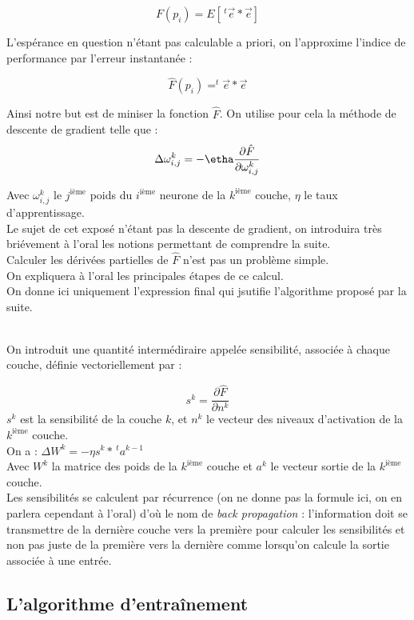 \documentclass[a4paper, 11pt]{article}
\begin{document}
$$ F(p_i)  = E[\,^t  \vec{e} * \vec{e}]$$

L'espérance en question n'étant pas calculable a priori, on l'approxime l'indice de performance par l'erreur instantanée :

$$  \hat{F}(p_i) = ^t \vec{e}*\vec{e}$$

Ainsi notre but est de miniser la fonction $ \hat{F} $.
On utilise pour cela la méthode de descente de gradient telle que : \\

$$ 
	\Delta \omega^{k}_{i,j} = -\etha \frac{\partial \hat{F}}{\partial \omega^{k}_{i,j}}
$$

Avec $ \omega^{k}_{i,j}$ le $j^{\text{ième}}$ poids du $i^{\text{ième}}$ neurone de la $k^{\text{ième}}$ couche, $\eta$ le taux d'apprentissage.\\
Le sujet de cet exposé n'étant pas la descente de gradient, on introduira très briévement à l'oral les notions permettant de comprendre la suite.\\
Calculer les dérivées partielles de $\hat{F}$ n'est pas un problème simple.
\\ On expliquera à l'oral les principales étapes de ce calcul.
\\ On donne ici uniquement l'expression final qui jsutifie l'algorithme proposé par la suite.

\\ On introduit une quantité intermédiraire appelée sensibilité, associée à chaque couche, définie vectoriellement par : 

$$ s^k = \frac{\partial \hat{F} }{\partial{n^k}}$$
$s^k$ est la sensibilité de la couche $k$, et $n^k$ le vecteur des niveaux d'activation de la $k^{\text{ième}}$ couche.
\\
\noident On a : $\Delta W^k = -\eta s^k * \,^t a^{k-1}$
\\ Avec $W^k$ la matrice des poids de la $k^{\text{ième}}$ couche et $a^k$ le vecteur sortie de la $k^{\text{ième}}$ couche.
\\Les sensibilités se calculent par récurrence (on ne donne pas la formule ici, on en parlera cependant à l'oral) d'où le nom de \emph{back propagation} : l'information doit se transmettre de la dernière couche vers la première pour calculer les sensibilités et non pas juste de la première vers la dernière comme lorsqu'on calcule la sortie associée à une entrée.

\subsection{L'algorithme d'entraînement}
\end{document}
